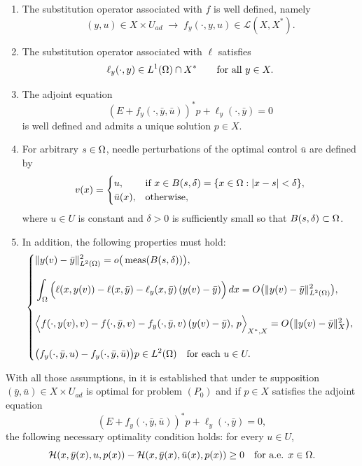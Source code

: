 \begin{enumerate}
\item The substitution operator associated with $f$ is well defined, namely
\[
(y,u) \in X \times U_{ad}
\;\longrightarrow\;
f_y(\cdot,y,u) \in \mathcal{L}(X,X^*).
\]

\item The substitution operator associated with $\ell$ satisfies
\[
\ell_y(\cdot,y) \in L^1(\Omega)\cap X^*
\qquad \text{for all } y \in X.
\]

\item The adjoint equation
\[
(E + f_y(\cdot,\bar{y},\bar{u}))^* p
+ \ell_y(\cdot,\bar{y}) = 0
\]
is well defined and admits a unique solution $p \in X$.

\item For arbitrary $s \in \Omega$, needle perturbations of the optimal control
$\bar u$ are defined by
\[
v(x)=
\begin{cases}
u, & \text{if } x \in B(s,\delta)
= \{ x \in \Omega : |x-s|<\delta \},\\
\bar{u}(x), & \text{otherwise},
\end{cases}
\]
where $u \in U$ is constant and $\delta>0$ is sufficiently small so that
$B(s,\delta)\subset\Omega$.

\item In addition, the following properties must hold:
\begin{equation}
\label{eq:additional_properties}
\left\{
\begin{aligned}
&\|y(v)-\bar{y}\|_{L^2(\Omega)}^2
= o\big(\operatorname{meas}(B(s,\delta))\big), \\[0.8em]
&\int_{\Omega}
\Big(
\ell(x,y(v))
- \ell(x,\bar{y})
- \ell_y(x,\bar{y})\,(y(v)-\bar{y})
\Big)\,dx
= O\big(\|y(v)-\bar{y}\|_{L^2(\Omega)}^2\big), \\[1em]
&\Big\langle
f(\cdot,y(v),v)
- f(\cdot,\bar{y},v)
- f_y(\cdot,\bar{y},v)\,(y(v)-\bar{y}),
\, p
\Big\rangle_{X^*,X}
= O\big(\|y(v)-\bar{y}\|_{X}^2\big), \\[1em]
&\big(
f_y(\cdot,\bar{y},u)
- f_y(\cdot,\bar{y},\bar{u})
\big)p
\in L^2(\Omega)
\quad \text{for each } u \in U.
\end{aligned}
\right.
\end{equation}
\end{enumerate}
With all those assumptions, in \cite[Theorem 2.2]{ito-kunisch2014} it is established that under
te supposition $(\bar y,\bar u) \in X \times U_{ad}$ is optimal for problem $(P_{0})$ and if 
$p \in X$ satisfies the adjoint equation
\[
(E + f_y(\cdot,\bar y,\bar u))^* p
+ \ell_y(\cdot,\bar y) = 0,
\]
the following necessary optimality condition holds: for every $u \in U$,
\begin{equation}\label{eq:pontryagin}
\mathcal H(x,\bar y(x),u,p(x))
-
\mathcal H(x,\bar y(x),\bar u(x),p(x))
\ge 0
\quad \text{for a.e. } x \in \Omega.
\end{equation}

